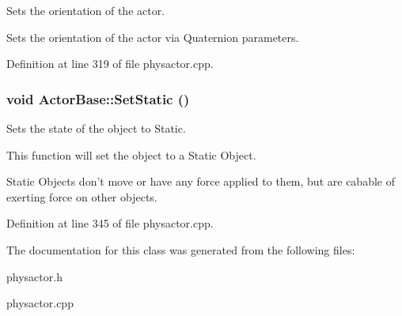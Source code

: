 Sets the orientation of the actor. 

Sets the orientation of the actor via Quaternion parameters. 

Definition at line 319 of file physactor.cpp.

\hypertarget{classActorBase_a97f55e5fff5d69483ebb0b9042a50bb0}{
\subsubsection[{SetStatic}]{\setlength{\rightskip}{0pt plus 5cm}void ActorBase::SetStatic ()}}
\label{dd/d7b/classActorBase_a97f55e5fff5d69483ebb0b9042a50bb0}


Sets the state of the object to Static. 

This function will set the object to a Static Object. \par
 Static Objects don't move or have any force applied to them, but are cabable of exerting force on other objects. 

Definition at line 345 of file physactor.cpp.



The documentation for this class was generated from the following files:\begin{DoxyCompactItemize}
\item 
physactor.h\item 
physactor.cpp\end{DoxyCompactItemize}
